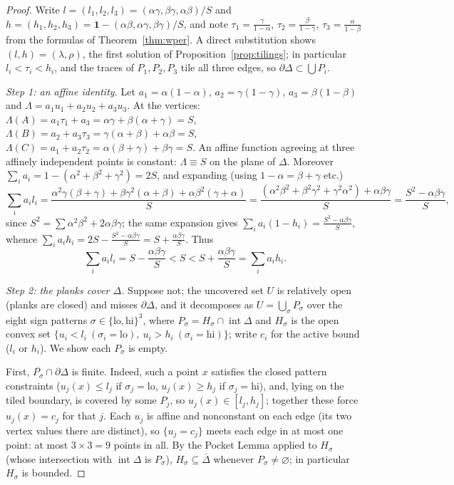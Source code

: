 \documentclass[11pt,reqno]{amsart}
\theoremstyle{plain}
\theoremstyle{definition}
\theoremstyle{remark}
\begin{document}
\begin{proof}
Write $l=(l_1,l_2,l_3)=(\alpha\gamma,\beta\gamma,\alpha\beta)/S$ and
$h=(h_1,h_2,h_3)=\mathbf1-(\alpha\beta,\alpha\gamma,\beta\gamma)/S$, and note
$\tau_1=\frac{\gamma}{1-\alpha}$, $\tau_2=\frac{\beta}{1-\gamma}$,
$\tau_3=\frac{\alpha}{1-\beta}$ from the formulas of Theorem~\ref{thm:wper}. A
direct substitution shows $(l,h)=(\lambda,\rho)$, the first solution of
Proposition~\ref{prop:tilings}; in particular $l_i<\tau_i<h_i$, and the traces
of $P_1,P_2,P_3$ tile all three edges, so $\partial\Delta\subset\bigcup P_i$.

\emph{Step 1: an affine identity.} Let $a_1=\alpha(1-\alpha)$,
$a_2=\gamma(1-\gamma)$, $a_3=\beta(1-\beta)$ and
$\Lambda=a_1u_1+a_2u_2+a_3u_3$. At the vertices:
$\Lambda(A)=a_1\tau_1+a_3=\alpha\gamma+\beta(\alpha+\gamma)=S$,
$\Lambda(B)=a_2+a_3\tau_3=\gamma(\alpha+\beta)+\alpha\beta=S$,
$\Lambda(C)=a_1+a_2\tau_2=\alpha(\beta+\gamma)+\beta\gamma=S$. An affine
function agreeing at three affinely independent points is constant:
$\Lambda\equiv S$ on the plane of $\Delta$. Moreover
$\sum_ia_i=1-(\alpha^2+\beta^2+\gamma^2)=2S$, and expanding (using
$1-\alpha=\beta+\gamma$ etc.)
\[
\textstyle\sum_i a_il_i
=\frac{\alpha^2\gamma(\beta+\gamma)+\beta\gamma^2(\alpha+\beta)
+\alpha\beta^2(\gamma+\alpha)}{S}
=\frac{(\alpha^2\beta^2+\beta^2\gamma^2+\gamma^2\alpha^2)+\alpha\beta\gamma}{S}
=\frac{S^2-\alpha\beta\gamma}{S},
\]
since $S^2=\sum\alpha^2\beta^2+2\alpha\beta\gamma$; the same expansion gives
$\sum_ia_i(1-h_i)=\frac{S^2-\alpha\beta\gamma}S$, whence
$\sum_ia_ih_i=2S-\frac{S^2-\alpha\beta\gamma}S=S+\frac{\alpha\beta\gamma}S$.
Thus
\begin{equation}\label{eq:margin}
\textstyle\sum_i a_il_i=S-\frac{\alpha\beta\gamma}S<S<
S+\frac{\alpha\beta\gamma}S=\sum_i a_ih_i .
\end{equation}

\emph{Step 2: the planks cover $\Delta$.} Suppose not; the uncovered set $U$ is
relatively open (planks are closed) and misses $\partial\Delta$, and it
decomposes as $U=\bigcup_\sigma P_\sigma$ over the eight sign patterns
$\sigma\in\{\mathrm{lo},\mathrm{hi}\}^3$, where $P_\sigma=H_\sigma\cap
\operatorname{int}\Delta$ and $H_\sigma$ is the open convex set
$\{u_i<l_i\ (\sigma_i=\mathrm{lo}),\ u_i>h_i\ (\sigma_i=\mathrm{hi})\}$; write
$c_i$ for the active bound ($l_i$ or $h_i$). We show each $P_\sigma$ is empty.

First, $\overline{P_\sigma}\cap\partial\Delta$ is finite. Indeed, such a point
$x$ satisfies the closed pattern constraints ($u_j(x)\le l_j$ if
$\sigma_j=\mathrm{lo}$, $u_j(x)\ge h_j$ if $\sigma_j=\mathrm{hi}$), and, lying
on the tiled boundary, is covered by some $P_j$, so $u_j(x)\in[l_j,h_j]$;
together these force $u_j(x)=c_j$ for that $j$. Each $u_j$ is affine and
nonconstant on each edge (its two vertex values there are distinct), so
$\{u_j=c_j\}$ meets each edge in at most one point: at most $3\times3=9$ points
in all. By the Pocket Lemma applied to $H_\sigma$ (whose intersection
with $\operatorname{int}\Delta$ is $P_\sigma$),
$H_\sigma\subseteq\overline\Delta$ whenever $P_\sigma\ne\varnothing$; in
particular $H_\sigma$ is bounded.


\end{proof}
\end{document}
